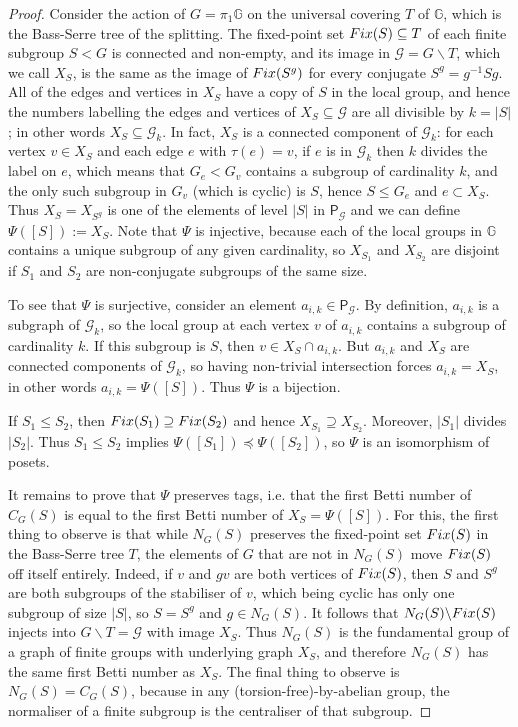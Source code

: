 \documentclass[11pt, a4 paper]{amsart}
\numberwithin{equation}{section}
\theoremstyle{remark}
\theoremstyle{definition}
\def\GG{\mathbb{G}}
\def\mc{\mathcal}
\begin{document}
\begin{proof}
	Consider the action of $G=\pi_1\GG$ on
	the universal covering $T$ of $\GG$, which is the Bass-Serre tree of the splitting.
	The fixed-point set ${\rm{Fix}}(S)\subseteq T$ of each finite subgroup $S<G$
	is connected and non-empty, and its image in $\mc{G}=G\backslash T$, which we call  $X_S$, is the same as the image of
	${\rm{Fix}}(S^g)$ for every conjugate $S^g=g^{-1}Sg$. All of the edges and vertices in $X_S$
	have a copy of $S$ in the local group, and hence the numbers labelling the edges and vertices of $X_S\subseteq\mc{G}$
	are all divisible by $k=|S|$; in other words $X_S\subseteq\mc{G}_k$. In fact,
	$X_S$ is a connected component of $\mc{G}_k$: for each vertex $v\in X_S$ and each
	edge $e$ with $\tau(e)=v$, if $e$ is in $\mc{G}_k$ then $k$ divides
	the label on $e$, which means that  $G_e<G_v$ contains a subgroup of cardinality $k$, and the only such subgroup in  
	$G_v$ (which is cyclic) is $S$, hence $S \leq G_e$ and $e\subset X_S$.  Thus $X_S=X_{S^g}$  is one of the elements
	of level $|S|$ in  $\mathsf{P}_\mathcal{G}$ and we can define $\Psi([S]) := X_S$.
	Note that $\Psi$ is injective, because each of the local groups  in $\GG$ contains a unique subgroup
	of any given cardinality, so $X_{S_1}$ and $X_{S_2}$ are disjoint if $S_1$ and $S_2$ are non-conjugate subgroups
	of the same size.
	
	To see that $\Psi$ is surjective, consider an element $a_{i,k}\in \mathsf{P}_\mathcal{G}$. By definition,
	$a_{i,k}$ is a subgraph of $\mc{G}_k$, so the local group at each vertex $v$ of $a_{i,k}$ contains a subgroup of
	cardinality $k$. If this subgroup is $S$, then $v\in X_S \cap a_{i,k}$. 
	But $a_{i,k}$ and $X_S$ are connected components of $\mc{G}_k$, so having non-trivial intersection forces $a_{i,k}=X_S$,
	in other words $a_{i,k} = \Psi([S])$. Thus $\Psi$ is a bijection.
	
	If $S_1 \leq S_2$, then ${\rm{Fix}}(S_1)\supseteq {\rm{Fix}}(S_2)$ 
	and hence $X_{S_1}\supseteq X_{S_2}$.
	Moreover, $|S_1|$ divides $|S_2|$. 
	Thus $S_1 \leq S_2$ implies $\Psi([S_1]) \preceq \Psi([S_2])$,
	so $\Psi$ is an isomorphism of posets.
	
	It remains to prove that $\Psi$ preserves tags, i.e. that the first Betti number of $C_G(S)$ is equal to the
	first Betti number of $X_S = \Psi([S])$. For this, the first thing to observe is that 
	while $N_G(S)$ preserves the fixed-point set ${\rm{Fix}}(S)$ in the Bass-Serre tree $T$,
	the elements of $G$ that are not in $N_G(S)$ move ${\rm{Fix}}(S)$  off itself entirely. 
	Indeed,  if $v$ and $gv$ are both vertices of ${\rm{Fix}}(S)$, then $S$ and $S^g$ are both subgroups of the
	stabiliser of $v$, which being cyclic has only one subgroup of size $|S|$, so $S=S^g$ and $g\in N_G(S)$.
	It follows that $N_G(S)\backslash{\rm{Fix}}(S)$ injects into $G\backslash T = \mathcal{G}$ with image $X_S$.
	Thus $N_G(S)$ is the fundamental group of a graph of finite groups with underlying graph $X_S$,
	and therefore $N_G(S)$ has  the same first Betti number as $X_S$. 
	The final thing to observe is  $N_G(S) = C_G(S)$, because in any (torsion-free)-by-abelian group,
	the normaliser of a finite subgroup  is the centraliser of that subgroup. 
\end{proof}
\end{document}
